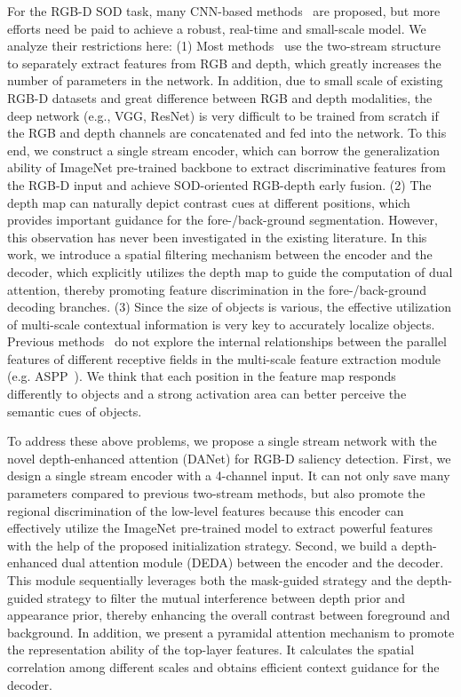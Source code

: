 \documentclass[runningheads]{llncs}
\begin{document}
For the RGB-D SOD task, many CNN-based methods~\cite{PCA,MMCI,TANet,CPFP,DMRA,HDFNet} are proposed, but more efforts need be paid to achieve a robust, real-time and small-scale model. We analyze their restrictions here: (1) Most methods~\cite{CTMF,PDNet,PCA,AF_RGBD,MMCI,DMRA} use the two-stream structure to separately extract features from RGB and depth, which greatly increases the number of parameters in the network. 
In addition, due to small scale of existing RGB-D datasets and great difference between RGB and depth modalities, the deep network (e.g., VGG, ResNet) is very difficult to be trained from scratch if the RGB and depth channels are concatenated and fed into the network.
To this end, we construct a single stream encoder, which can borrow the generalization ability of ImageNet pre-trained backbone to extract discriminative features from the RGB-D input and achieve SOD-oriented RGB-depth early fusion.    
(2)
The depth map can naturally depict contrast cues at different positions, which provides important guidance for the fore-/back-ground segmentation. However, this observation has never been investigated in the existing literature. In this work,
we introduce a spatial filtering mechanism between the encoder and the decoder, which explicitly utilizes the depth map to guide the computation of dual attention, thereby promoting feature discrimination in the fore-/back-ground decoding branches. 
(3) Since the size of objects is various, the effective utilization of multi-scale contextual information is very key to accurately localize objects. Previous methods~\cite{SRM,R3Net,BMPM,PFA,DMRA} 
do not explore the internal relationships between the parallel features of different receptive fields in the multi-scale feature extraction module (e.g. ASPP~\cite{Deeplab}). 
We think that each position in the feature map responds differently to objects and a strong activation area can better perceive the semantic cues of objects.

To address these above problems, we propose a single stream network with the novel depth-enhanced  attention (DANet) for RGB-D saliency detection. First, we design a single stream encoder with a 4-channel input. It can not only save many parameters compared to previous two-stream methods, but also promote the regional discrimination of the low-level features because this encoder can effectively utilize the ImageNet pre-trained model to extract powerful features with the help of the proposed initialization strategy. Second, we build a depth-enhanced dual attention module (DEDA) between the encoder and the decoder. 
This module sequentially leverages both the mask-guided strategy and the depth-guided strategy to filter the mutual interference between depth prior and appearance prior, thereby enhancing the overall contrast between  foreground and background.   
In addition, we present a pyramidal attention mechanism to promote the representation ability of the top-layer features. It calculates the spatial correlation among different scales and obtains efficient context guidance for the decoder. 
\end{document}
